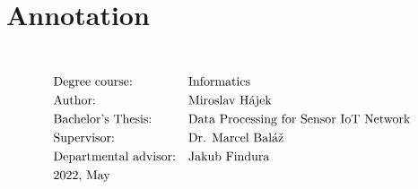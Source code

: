 \section*{Annotation}
\UniversityEN \\
\uppercase{\FacultyEN}
\vspace{-8pt}
{\setlength{\mathindent}{0cm}
\begin{align*}
&\text{Degree course:} && \text{\StudyProgrammeEN} \\
&\text{Author:} && \text{\Author} \\
&\text{\ThesisEN:} && \text{\TitleEN} \\
&\text{Supervisor:} && \text{\SupervisorEN} \\
&\text{Departmental advisor:} && \text{\PedagogicalSupervisorEN} \\
&\text{\DateEN}
\end{align*}}
%
%

\emptypage 